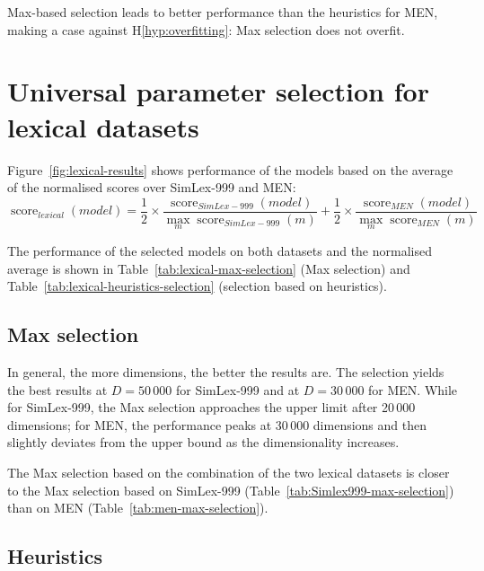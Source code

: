 Max-based selection leads to better performance than the heuristics for MEN, making a case against H\ref{hyp:overfitting}: Max selection does not overfit.

\section{Universal parameter selection for lexical datasets}
\label{sec:universal-lexical-param-selection}



Figure~\ref{fig:lexical-results} shows performance of the models based on the average of the normalised scores over SimLex-999 and MEN:
\begin{equation}
\operatorname{score}_\mathit{lexical}(\mathit{model}) =%
\frac{1}{2}\times%
\frac{\operatorname{score}_\mathit{SimLex-999}(\mathit{model})}%
{\max_m\operatorname{score}_\mathit{SimLex-999}(m)}%
+%
\frac{1}{2}\times%
\frac{\operatorname{score}_\mathit{MEN}(\mathit{model})}%
{\max_m\operatorname{score}_\mathit{MEN}(m)}%
\end{equation}

The performance of the selected models on both datasets and the normalised average is shown in Table~\ref{tab:lexical-max-selection} (Max selection) and Table~\ref{tab:lexical-heuristics-selection} (selection based on heuristics).



\subsection{Max selection}
\label{sec:max-selection}

In general, the more dimensions, the better the results are. The selection yields the best results at $D = 50\,000$ for SimLex-999 and at $D = 30\,000$ for MEN. While for SimLex-999, the Max selection approaches the upper limit after 20\,000 dimensions; for MEN, the performance peaks at 30\,000 dimensions and then slightly deviates from the upper bound as the dimensionality increases.

The Max selection based on the combination of the two lexical datasets is closer to the Max selection based on SimLex-999 (Table~\ref{tab:Simlex999-max-selection}) than on MEN (Table~\ref{tab:men-max-selection}).



\subsection{Heuristics}

